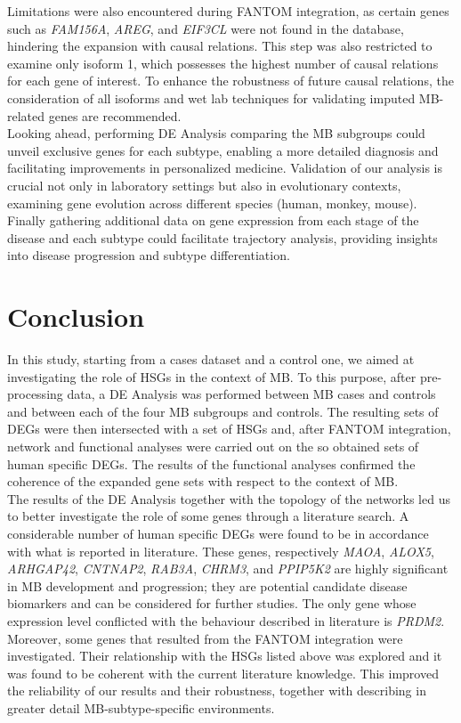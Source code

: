 \documentclass[10pt]{SelfArx} %
\begin{document}
Limitations were also encountered during FANTOM \cite{fantom5} integration, as certain genes such as \textit{FAM156A}, \textit{AREG}, and \textit{EIF3CL} were not found in the database, hindering the expansion with causal relations. This step was also restricted to examine only isoform 1, which possesses the highest number of causal relations for each gene of interest. To enhance the robustness of future causal relations, the consideration of all isoforms and wet lab techniques for validating imputed MB-related genes are recommended. \\
Looking ahead, performing DE Analysis comparing the MB subgroups could unveil exclusive genes for each subtype, enabling a more detailed diagnosis and facilitating improvements in personalized medicine. Validation of our analysis is crucial not only in laboratory settings but also in evolutionary contexts, examining gene evolution across different species (human, monkey, mouse). \\        
Finally gathering additional data on gene expression from each stage of the disease and each subtype could facilitate trajectory analysis, providing insights into disease progression and subtype differentiation. 

\section{Conclusion}\label{sec:conclusion}
In this study, starting from a cases dataset and a control one, we aimed at investigating the role of HSGs in the context of MB. To this purpose, after pre-processing data, a DE Analysis was performed between MB cases and controls and between each of the four MB subgroups and controls. The resulting sets of DEGs were then intersected with a set of HSGs and, after FANTOM \cite{fantom5} integration, network and functional analyses were carried out on the so obtained sets of human specific DEGs. The results of the functional analyses confirmed the coherence of the expanded gene sets with respect to the context of MB.\\
The results of the DE Analysis together with the topology of the networks led us to better investigate the role of some genes through a literature search. A considerable number of human specific DEGs were found to be in accordance with what is reported in literature. These genes, respectively \textit{MAOA}, \textit{ALOX5}, \textit{ARHGAP42}, \textit{CNTNAP2}, \textit{RAB3A}, \textit{CHRM3}, and \textit{PPIP5K2} are highly significant in MB development and progression; they are potential candidate disease biomarkers and can be considered for further studies. The only gene whose expression level conflicted with the behaviour described in literature is \textit{PRDM2}.\\
Moreover, some genes that resulted from the FANTOM \cite{fantom5} integration were investigated. Their relationship with the HSGs listed above was explored and it was found to be coherent with the current literature knowledge. This improved the reliability of our results and their robustness, together with describing in greater detail MB-subtype-specific environments.\\
\end{document}
